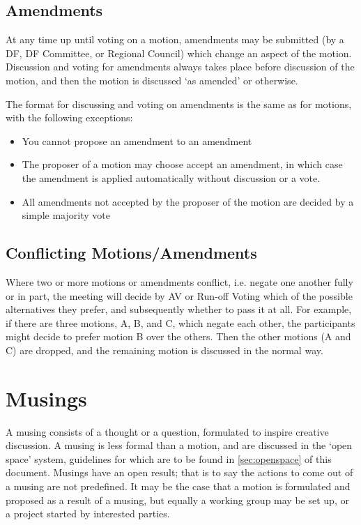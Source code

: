\documentclass[a4paper, 12pt]{article} %
\begin{document}
\subsection{Amendments}
At any time up until voting on a motion, amendments may be submitted (by a DF, DF Committee, or Regional Council) which change an aspect of the motion.  Discussion and voting for amendments always takes place before discussion of the motion, and then the motion is discussed `as amended' or otherwise.

The format for discussing and voting on amendments is the same as for motions, with the following exceptions:
\begin{itemize}
\item You cannot propose an amendment to an amendment
\item The proposer of a motion may choose accept an amendment, in which case the amendment is applied automatically without discussion or a vote.
\item All amendments not accepted by the proposer of the motion are decided by a simple majority vote
\end{itemize}

\subsection{Conflicting Motions/Amendments}
Where two or more motions or amendments conflict, i.e. negate one another fully or in part, the meeting will decide by AV or Run-off Voting which of the possible alternatives they prefer, and subsequently whether to pass it at all.  For example, if there are three motions, A, B, and C, which negate each other, the participants might decide to prefer motion B over the others.  Then the other motions (A and C) are dropped, and the remaining motion is discussed in the normal way.

\section{Musings}
A musing consists of a thought or a question, formulated to inspire creative discussion.  A musing is less formal than a motion, and are discussed in the `open space' system, guidelines for which are to be found in \autoref{sec:openspace} of this document.  Musings have an open result; that is to say the actions to come out of a musing are not predefined.  It may be the case that a motion is formulated and proposed as a result of a musing, but equally a working group may be set up, or a project started by interested parties.
\end{document}
